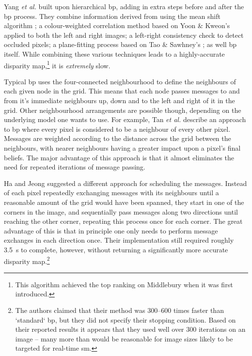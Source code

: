 Yang \textit{et al.} \cite{Yang2006a} built upon hierarchical \gls{bp}, adding in extra steps before and after the \gls{bp} process.  They combine information derived from using the mean shift algorithm \cite{Comaniciu2002}; a colour-weighted correlation method based on Yoon \& Kweon's \cite{Yoon2006} applied to both the left and right images; a left-right consistency check to detect occluded pixels; a plane-fitting process based on Tao \& Sawhney's \cite{Tao2000}; as well \gls{bp} itself.  While combining these various techniques leads to a highly-accurate disparity map,\footnote{This algorithm achieved the top ranking on Middlebury when it was first introduced.} it is \emph{extremely} slow.

Typical \gls{bp} uses the four-connected neighbourhood to define the neighbours of each given node in the grid.  This means that each node passes messages to and from it's immediate neighbours up, down and to the left and right of it in the grid.  Other neighbourhood arrangements are possible though, depending on the underlying model one wants to use.  For example, Tan \textit{et al.} \cite{Tan2017} describe an approach to \gls{bp} where every pixel is considered to be a neighbour of every other pixel.  Messages are weighted according to the distance across the grid between the neighbours, with nearer neighbours having a greater impact upon a pixel's final beliefs.  The major advantage of this approach is that it almost eliminates the need for repeated iterations of message passing.

Ha and Jeong \cite{Ha2016} suggested a different approach for scheduling the messages.  Instead of each pixel repeatedly exchanging messages with its neighbours until a reasonable amount of the grid would have been spanned, they start in one of the corners in the image, and sequentially pass messages along two directions until reaching the other corner, repeating this process once for each corner.  The great advantage of this is that in principle one only needs to perform message exchanges in each direction once.  Their implementation still required roughly \SI{3.5}{\second} to complete, however, without returning a significantly more accurate disparity map.\footnote{The authors claimed that their method was \numrange{300}{600} times faster than `standard` \gls{bp}, but they did not specify their stopping condition.  Based on their reported results it appears that they used well over 300 iterations on an image -- many more than would be reasonable for image sizes likely to be targeted for real-time \gls{sm}.}

